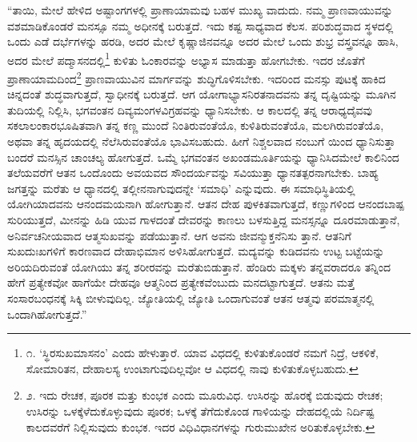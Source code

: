“ತಾಯಿ, ಮೇಲೆ ಹೇಳಿದ ಅಷ್ಟಾಂಗಗಳಲ್ಲಿ ಪ್ರಾಣಾಯಾಮವು ಬಹಳ ಮುಖ್ಯ ವಾದುದು. ನಮ್ಮ ಪ್ರಾಣವಾಯುವನ್ನು ವಶಮಾಡಿಕೊಂಡರೆ ಮನಸ್ಸೂ ನಮ್ಮ ಅಧೀನಕ್ಕೆ ಬರುತ್ತದೆ. ಇದು ಕಷ್ಟ ಸಾಧ್ಯವಾದ ಕೆಲಸ. ಪರಿಶುದ್ಧವಾದ ಸ್ಥಳದಲ್ಲಿ ಒಂದು ಎಡೆ ದರ್ಭೆಗಳನ್ನು ಹರಡಿ, ಅದರ ಮೇಲೆ ಕೃಷ್ಣಾಜಿನವನ್ನೂ ಅದರ ಮೇಲೆ ಒಂದು ಶುಭ್ರ ವಸ್ತ್ರವನ್ನೂ ಹಾಸಿ, ಅದರ ಮೇಲೆ ಪದ್ಮಾಸನದಲ್ಲಿ\footnote{೧. ‘ಸ್ಥಿರಸುಖಮಾಸನಂ’ ಎಂದು ಹೇಳುತ್ತಾರೆ. ಯಾವ ವಿಧದಲ್ಲಿ ಕುಳಿತುಕೊಂಡರೆ ನಮಗೆ ನಿದ್ರೆ, ಆಕಳಿಕೆ, ಸೋಮಾರಿತನ, ದೇಹಾಲಸ್ಯ ಉಂಟಾಗುವುದಿಲ್ಲವೋ ಆ ವಿಧದಲ್ಲಿ ನಾವು ಕುಳಿತುಕೊಳ್ಳಬಹುದು.} ಕುಳಿತು ಓಂಕಾರವನ್ನು ಅಭ್ಯಾಸ ಮಾಡುತ್ತಾ ಹೋಗಬೇಕು. ಇದರ ಜೊತೆಗೆ ಪ್ರಾಣಾಯಾಮದಿಂದ\footnote{೨. ಇದು ರೇಚಕ, ಪೂರಕ ಮತ್ತು ಕುಂಭಕ ಎಂದು ಮೂರುವಿಧ. ಉಸಿರನ್ನು ಹೊರಕ್ಕೆ ಬಿಡುವುದು ರೇಚಕ; ಉಸಿರನ್ನು ಒಳಕ್ಕೆಳೆದುಕೊಳ್ಳುವುದು ಪೂರಕ; ಒಳಕ್ಕೆ ತೆಗೆದುಕೊಂಡ ಗಾಳಿಯನ್ನು ದೇಹದಲ್ಲಿಯೆ ನಿರ್ದಿಷ್ಟ ಕಾಲದವರೆಗೆ ನಿಲ್ಲಿಸುವುದು ಕುಂಭಕ. ಇದರ ವಿಧಿವಿಧಾನಗಳನ್ನು ಗುರುಮುಖೇನ ಅರಿತುಕೊಳ್ಳಬೇಕು.} ಪ್ರಾಣವಾಯುವಿನ ಮಾರ್ಗವನ್ನು ಶುದ್ಧಿಗೊಳಿಸಬೇಕು. ಇದರಿಂದ ಮನಸ್ಸು ಪುಟಕ್ಕೆ ಹಾಕಿದ ಚಿನ್ನದಂತೆ ಶುದ್ಧವಾಗುತ್ತದೆ, ಸ್ವಾಧೀನಕ್ಕೆ ಬರುತ್ತದೆ. ಆಗ ಯೋಗಾಭ್ಯಾಸನಿರತನಾದವನು ತನ್ನ ದೃಷ್ಟಿಯನ್ನು ಮೂಗಿನ ತುದಿಯಲ್ಲಿ ನಿಲ್ಲಿಸಿ, ಭಗವಂತನ ದಿವ್ಯಮಂಗಳವಿಗ್ರಹವನ್ನು ಧ್ಯಾನಿಸಬೇಕು. ಆ ಕಾಲದಲ್ಲಿ ತನ್ನ ಆರಾಧ್ಯದೈವವು ಸಕಲಾಲಂಕಾರಭೂಷಿತವಾಗಿ ತನ್ನ ಕಣ್ಣ ಮುಂದೆ ನಿಂತಿರುವಂತೆಯೊ, ಕುಳಿತಿರುವಂತೆಯೊ, ಮಲಗಿರುವಂತೆಯೊ, ಅಥವಾ ತನ್ನ ಹೃದಯದಲ್ಲಿ ನೆಲೆಸಿರುವಂತೆಯೊ ಭಾವಿಸಬಹುದು. ಹೀಗೆ ನಿಶ್ಚಲವಾದ ನಂಬುಗೆ ಯಿಂದ ಧ್ಯಾನಿಸುತ್ತಾ ಬಂದರೆ ಮನಸ್ಸಿನ ಚಾಂಚಲ್ಯ ಹೋಗುತ್ತದೆ. ಒಮ್ಮೆ ಭಗವಂತನ ಅಖಂಡಮೂರ್ತಿಯನ್ನು ಧ್ಯಾನಿಸಿದಮೇಲೆ ಕಾಲಿನಿಂದ ತಲೆಯವರೆಗೆ ಆತನ ಒಂದೊಂದು ಅವಯವದ ಸೌಂದರ್ಯವನ್ನು ಸವಿಯುತ್ತಾ ಧ್ಯಾನತತ್ಪರನಾಗಬೇಕು. ಬಾಹ್ಯ ಜಗತ್ತನ್ನು ಮರೆತು ಆ ಧ್ಯಾನದಲ್ಲಿ ತಲ್ಲೀನನಾಗುವುದನ್ನೇ ‘ಸಮಾಧಿ’ ಎನ್ನುವುದು. ಈ ಸಮಾಧಿಸ್ಥಿತಿಯಲ್ಲಿ ಯೋಗಿಯಾದವನು ಆನಂದಮಯನಾಗಿ ಹೋಗುತ್ತಾನೆ. ಆತನ ದೇಹ ಪುಳಕಿತವಾಗುತ್ತದೆ, ಕಣ್ಣುಗಳಿಂದ ಆನಂದಬಾಷ್ಪ ಸುರಿಯುತ್ತದೆ, ಮೀನನ್ನು ಹಿಡಿ ಯುವ ಗಾಳದಂತೆ ದೇವರನ್ನು ಕಾಣಲು ಬಳಸುತ್ತಿದ್ದ ಮನಸ್ಸನ್ನೂ ದೂರಮಾಡುತ್ತಾನೆ, ಅನಿರ್ವಚನೀಯವಾದ ಆತ್ಮಸುಖವನ್ನು ಪಡೆಯುತ್ತಾನೆ. ಆಗ ಅವನು ಜೀವನ್ಮುಕ್ತನೆನಿಸು ತ್ತಾನೆ. ಆತನಿಗೆ ಸುಖದುಃಖಗಳಿಗೆ ಕಾರಣವಾದ ದೇಹಾಭಿಮಾನ ಅಳಿಸಿಹೋಗುತ್ತದೆ. ಮದ್ಯವನ್ನು ಕುಡಿದವನು ಉಟ್ಟ ಬಟ್ಟೆಯನ್ನು ಅರಿಯದಿರುವಂತೆ ಯೋಗಿಯು ತನ್ನ ಶರೀರವನ್ನು ಮರೆತುಬಿಡುತ್ತಾನೆ. ಹೆಂಡಿರು ಮಕ್ಕಳು ತನ್ನವರಾದರೂ ತನ್ನಿಂದ ಹೇಗೆ ಪ್ರತ್ಯೇಕವೋ ಹಾಗೆಯೇ ದೇಹವೂ ಆತ್ಮನಿಂದ ಪ್ರತ್ಯೇಕವೆಂಬುದು ಮನದಟ್ಟಾಗುತ್ತದೆ. ಆತನು ಮತ್ತೆ ಸಂಸಾರಬಂಧನಕ್ಕೆ ಸಿಕ್ಕಿ ಬೀಳುವುದಿಲ್ಲ. ಜ್ಯೋತಿಯಲ್ಲಿ ಜ್ಯೋತಿ ಒಂದಾಗುವಂತೆ ಆತನ ಆತ್ಮವು ಪರಮಾತ್ಮನಲ್ಲಿ ಒಂದಾಗಿಹೋಗುತ್ತದೆ.”

